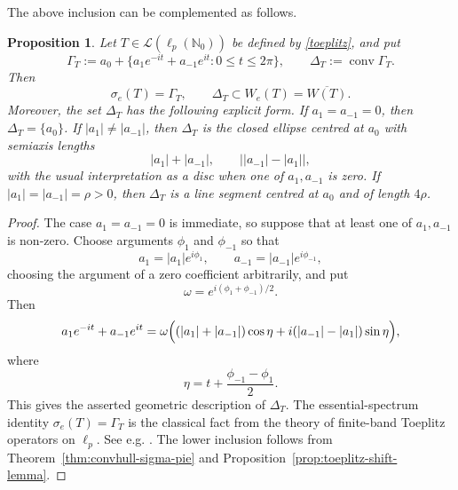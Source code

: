 \documentclass[11pt]{amsart}
\numberwithin{equation}{section}
\newtheorem{proposition}[theorem]{Proposition}
\theoremstyle{definition}
\theoremstyle{remark}
\DeclareMathOperator{\conv}{conv}
\newcommand{\We}{W_e}
\begin{document}
The above inclusion can be complemented as follows.
\begin{proposition}\label{prop:toeplitz-spectral-ellipse}
Let $T \in \mathcal L(\ell_p(\mathbb N_0))$ be defined by \eqref{toeplitz},
and put 
\[
        \Gamma_T:=a_0+\{a_1e^{-it}+a_{-1}e^{it}:0\le t\le2\pi\},
        \qquad
        \Delta_T:=\conv\Gamma_T .
\]
Then
\[
        \sigma_e(T)=\Gamma_T,
        \qquad
        \Delta_T\subset \We(T)=\overline{W(T)}.
\]
Moreover, the set $\Delta_T$ has the following explicit form. If
$a_1=a_{-1}=0$, then $\Delta_T=\{a_0\}$. If
$|a_1|\ne |a_{-1}|$, then $\Delta_T$ is the closed ellipse centred at
$a_0$ with 
semiaxis lengths
\[
        |a_1|+|a_{-1}|,
        \qquad
        \bigl||a_{-1}|-|a_1|\bigr|,
\]
with the usual interpretation as a disc when one of $a_1,a_{-1}$ is zero.
If $|a_1|=|a_{-1}|=\rho>0$, then $\Delta_T$ is a line segment centred at
$a_0$ and of length $4\rho$.
\end{proposition}

\begin{proof}
The case $a_1=a_{-1}=0$ is immediate, so suppose that at least one of
$a_1,a_{-1}$ is non-zero. Choose arguments $\phi_1$ and $\phi_{-1}$ so
that
\[
        a_1=|a_1|e^{i\phi_1},
        \qquad
        a_{-1}=|a_{-1}|e^{i\phi_{-1}},
\]
choosing the argument of a zero coefficient arbitrarily, and put
\[
        \omega=e^{i(\phi_1+\phi_{-1})/2}.
\]
Then
\[
        a_1e^{-it}+a_{-1}e^{it}
        =\omega\Bigl((|a_1|+|a_{-1}|)\cos\eta
        +i(|a_{-1}|-|a_1|)\sin\eta\Bigr),
\]
where
\[
        \eta=t+\frac{\phi_{-1}-\phi_1}{2}.
\]
This gives the asserted geometric description of $\Delta_T$.
The essential-spectrum identity $\sigma_e(T)=\Gamma_T$ is the classical
fact from the theory of finite-band Toeplitz operators on $\ell_p.$ See e.g.  \cite[Theorem~1]{Duren1964}.
The lower inclusion follows from Theorem~\ref{thm:convhull-sigma-pie} and
Proposition~\ref{prop:toeplitz-shift-lemma}.
\end{proof}
\end{document}
